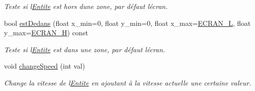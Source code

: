 \begin{DoxyCompactItemize}
\begin{DoxyCompactList}\small\item\em Teste si l\textquotesingle{}\hyperlink{class_entite}{Entite} est hors d\textquotesingle{}une zone, par défaut l\textquotesingle{}écran. \end{DoxyCompactList}\item 
bool \hyperlink{class_entite_a0861182f1af724c8b5fd70b30720fa04}{est\+Dedans} (float x\+\_\+min=0, float y\+\_\+min=0, float x\+\_\+max=\hyperlink{constantes_8h_a078285dfdd5f8d9caa79aeb3f4eb0a1f}{E\+C\+R\+A\+N\+\_\+L}, float y\+\_\+max=\hyperlink{constantes_8h_a75c426da06c2ec9164baaf36a262fa07}{E\+C\+R\+A\+N\+\_\+H}) const
\begin{DoxyCompactList}\small\item\em Teste si l\textquotesingle{}\hyperlink{class_entite}{Entite} est dans une zone, par défaut l\textquotesingle{}écran. \end{DoxyCompactList}\item 
void \hyperlink{class_entite_abd20483e4d51bc7ebb0eb58bb4366757}{change\+Speed} (int val)
\begin{DoxyCompactList}\small\item\em Change la vitesse de l\textquotesingle{}\hyperlink{class_entite}{Entite} en ajoutant à la vitesse actuelle une certaine valeur. \end{DoxyCompactList}\end{DoxyCompactItemize}
